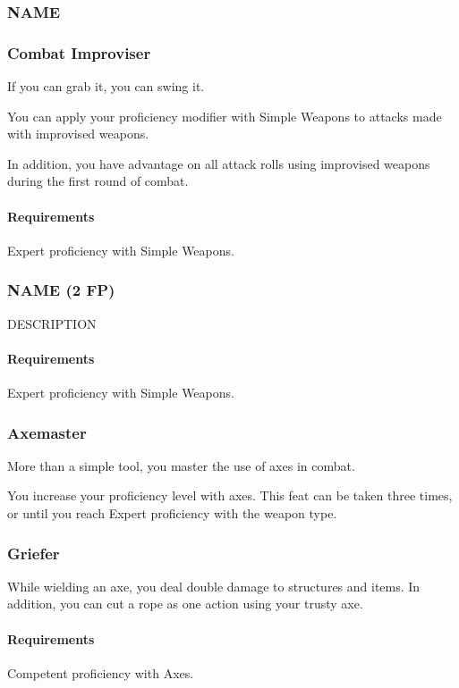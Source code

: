 \subsubsection{NAME} \label{feat::name}
\subsubsection{Combat Improviser} \label{feat::combatimproviser}
    If you can grab it, you can swing it.

    You can apply your proficiency modifier with Simple Weapons to attacks made with improvised weapons.

    In addition, you have advantage on all attack rolls using improvised weapons during the first round of combat.
    \paragraph{Requirements} Expert proficiency with Simple Weapons.
\subsubsection{NAME (2 FP)} \label{feat::name}
    DESCRIPTION
    \paragraph{Requirements} Expert proficiency with Simple Weapons.

\subsubsection{Axemaster} \label{feat::axemaster}
    More than a simple tool, you master the use of axes in combat.

    You increase your proficiency level with axes.
    This feat can be taken three times, or until you reach Expert proficiency with the weapon type.
\subsubsection{Griefer} \label{feat::griefer}
    While wielding an axe, you deal double damage to structures and items.
    In addition, you can cut a rope as one action using your trusty axe.
    \paragraph{Requirements} Competent proficiency with Axes.
